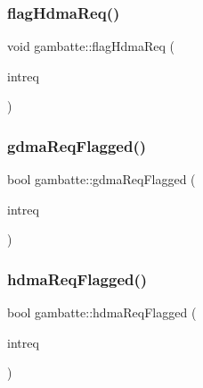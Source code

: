 \mbox{\label{namespacegambatte_a76b56771c7cc51d5a2a9d5158512becc}} 
\subsubsection{\texorpdfstring{flag\+Hdma\+Req()}{flagHdmaReq()}}
{\footnotesize\ttfamily void gambatte\+::flag\+Hdma\+Req (\begin{DoxyParamCaption}\item[{\hyperlink{classgambatte_1_1InterruptRequester}{Interrupt\+Requester} \&}]{intreq }\end{DoxyParamCaption})\hspace{0.3cm}{\ttfamily [inline]}}

\mbox{\label{namespacegambatte_a9ad0a8b7b8c1a34bfc2525dece4a0404}} 
\subsubsection{\texorpdfstring{gdma\+Req\+Flagged()}{gdmaReqFlagged()}}
{\footnotesize\ttfamily bool gambatte\+::gdma\+Req\+Flagged (\begin{DoxyParamCaption}\item[{\hyperlink{classgambatte_1_1InterruptRequester}{Interrupt\+Requester} const \&}]{intreq }\end{DoxyParamCaption})\hspace{0.3cm}{\ttfamily [inline]}}

\mbox{\label{namespacegambatte_ad50312ad0ce301d07f221e2161db6476}} 
\subsubsection{\texorpdfstring{hdma\+Req\+Flagged()}{hdmaReqFlagged()}}
{\footnotesize\ttfamily bool gambatte\+::hdma\+Req\+Flagged (\begin{DoxyParamCaption}\item[{\hyperlink{classgambatte_1_1InterruptRequester}{Interrupt\+Requester} const \&}]{intreq }\end{DoxyParamCaption})\hspace{0.3cm}{\ttfamily [inline]}}

